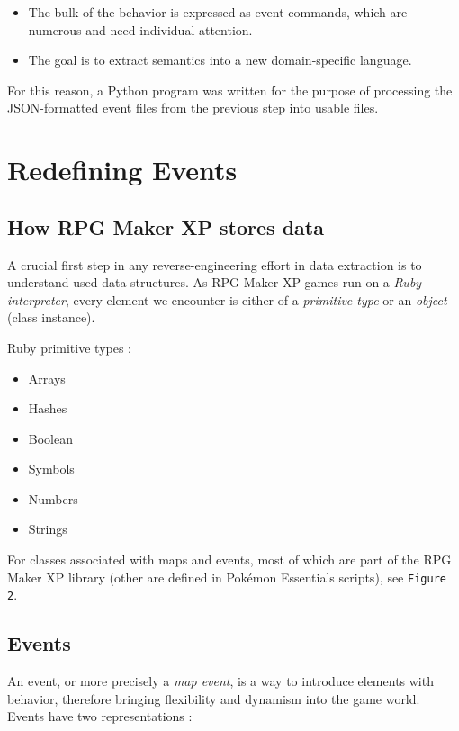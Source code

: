 \documentclass[11pt]{article}
\begin{document}
{\begin{itemize}
	\item The bulk of the behavior is expressed as event commands, which are numerous and need individual attention.
	
	\item The goal is to extract semantics into a new domain-specific language.
\end{itemize}

For this reason, a Python program was written for the purpose of processing the JSON-formatted event files from the previous step into usable files.








\newpage 
\section{Redefining Events}

\subsection{How RPG Maker XP stores data}

A crucial first step in any reverse-engineering effort in data extraction is to understand used data structures. As RPG Maker XP games run on a \textit{Ruby interpreter}, every element we encounter is either of a \textit{primitive type} or an \textit{object} (class instance).

Ruby primitive types :
\begin{itemize}
	\item Arrays
	\item Hashes
	\item Boolean
	\item Symbols
	\item Numbers
	\item Strings
	
\end{itemize}

\vspace{2mm}
For classes associated with maps and events, most of which are part of the RPG Maker XP library (other are defined in Pokémon Essentials scripts), see \texttt{Figure 2}.

\subsection{Events}

An event, or more precisely a \textit{map event}, is a way to introduce elements with behavior, therefore bringing flexibility and dynamism into the game world. Events have two representations :

}
\end{document}
